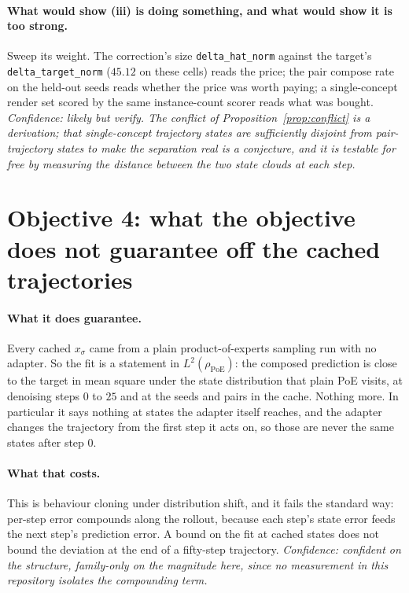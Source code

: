 \documentclass[11pt]{article}
\newcommand{\xs}{x_\sigma}
\theoremstyle{plain}
\theoremstyle{remark}
\begin{document}
\paragraph{What would show (iii) is doing something, and what would show it is too strong.}
Sweep its weight. The correction's size \texttt{delta\_hat\_norm} against the target's
\texttt{delta\_target\_norm} ($45.12$ on these cells) reads the price; the pair compose rate on the
held-out seeds reads whether the price was worth paying; a single-concept render set scored by the
same instance-count scorer reads what was bought. \emph{Confidence: likely but verify. The conflict
of Proposition~\ref{prop:conflict} is a derivation; that single-concept trajectory states are
sufficiently disjoint from pair-trajectory states to make the separation real is a conjecture, and
it is testable for free by measuring the distance between the two state clouds at each step.}

\section{Objective 4: what the objective does not guarantee off the cached trajectories}

\paragraph{What it does guarantee.}
Every cached $\xs$ came from a plain product-of-experts sampling run with no adapter. So the fit is a
statement in $L^2(\rho_{\mathrm{PoE}})$: the composed prediction is close to the target in mean
square under the state distribution that plain PoE visits, at denoising steps $0$ to $25$ and at the
seeds and pairs in the cache. Nothing more. In particular it says nothing at states the adapter
itself reaches, and the adapter changes the trajectory from the first step it acts on, so those are
never the same states after step $0$.

\paragraph{What that costs.}
This is behaviour cloning under distribution shift, and it fails the standard way: per-step error
compounds along the rollout, because each step's state error feeds the next step's prediction error.
A bound on the fit at cached states does not bound the deviation at the end of a fifty-step
trajectory. \emph{Confidence: confident on the structure, family-only on the magnitude here, since
no measurement in this repository isolates the compounding term.}
\end{document}
